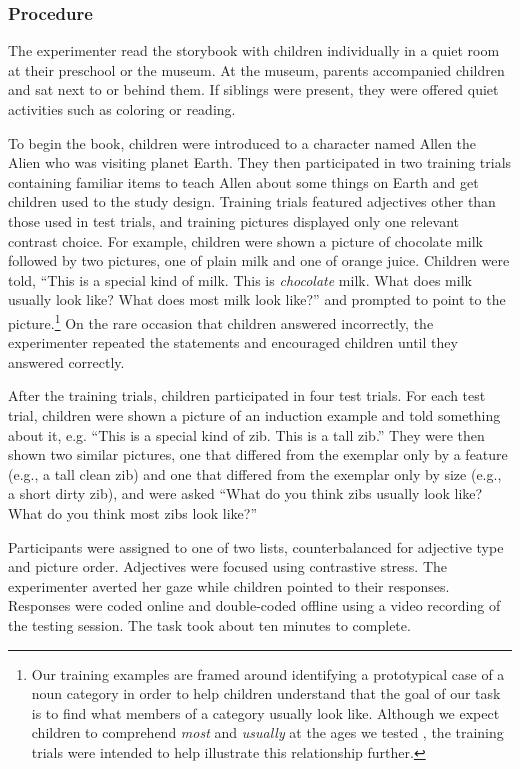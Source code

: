\documentclass[man]{apa2}
\begin{document}
\subsubsection{Procedure}

The experimenter read the storybook with children individually in a quiet room at their preschool or the museum.  At the museum, parents accompanied children and sat next to or behind them.  If siblings were present, they were offered quiet activities such as coloring or reading.

To begin the book, children were introduced to a character named Allen the Alien who was visiting planet Earth.  They then participated in two training trials containing familiar items to teach Allen about some things on Earth and get children used to the study design.  Training trials featured adjectives other than those used in test trials, and training pictures displayed only one relevant contrast choice.  For example, children were shown a picture of chocolate milk followed by two pictures, one of plain milk and one of orange juice. Children were told, ``This is a special kind of milk. This is \emph{chocolate} milk.  What does milk usually look like?  What does most milk look like?'' and prompted to point to the picture.\footnote{Our training examples are framed around identifying a prototypical case of a noun category in order to help children understand that the goal of our task is to find what members of a category usually look like. Although we expect children to comprehend \emph{most} and \emph{usually} at the ages we tested \cite{halberda2008}, the training trials were intended to  help illustrate this relationship further.}
On the rare occasion that children answered incorrectly, the experimenter repeated the statements and encouraged children until they answered correctly.  

After the training trials, children participated in four test trials.  For each test trial, children were shown a picture of an induction example and told something about it, e.g. ``This is a special kind of zib.  This is a tall zib.''  They were then shown two similar pictures, one that differed from the exemplar only by a feature (e.g., a tall clean zib) and one that differed from the exemplar only by size (e.g., a short dirty zib), and were asked ``What do you think zibs usually look like?  What do you think most zibs look like?'' 

Participants were assigned to one of two lists, counterbalanced for adjective type and picture order.  Adjectives were focused using contrastive stress. The experimenter averted her gaze while children pointed to their responses.  Responses were coded online and double-coded offline using a video recording of the testing session.  The task took about ten minutes to complete. 
\end{document}
